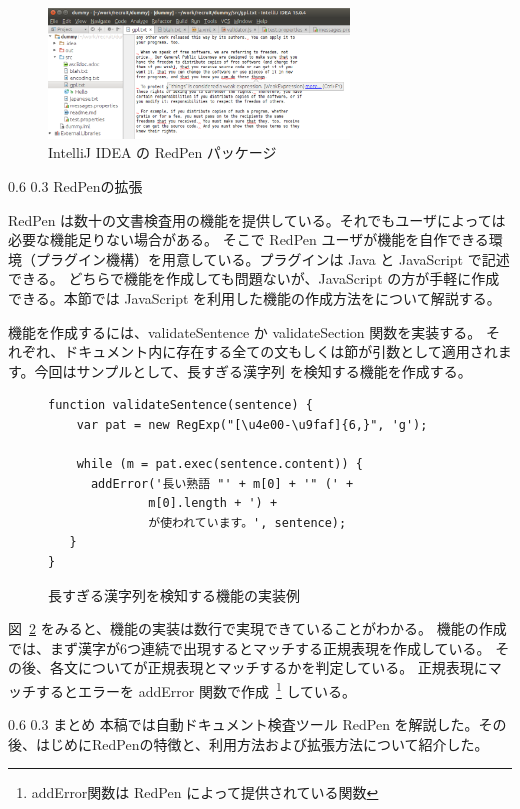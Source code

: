 \documentclass[a4j,twocolumn]{jarticle}
\makeatletter
\def\section{\@startsection{section}{1}{\z@}%
   {0.6\Cvs}%
   {0.3\Cvs}%
   {\reset@font\fontsize{10.5pt}{0pt}\bfseries}}
\makeatother
\begin{document}
\begin{figure}[thbp]
  \begin{center}
    \includegraphics[width=8cm]{figs/intellij.eps}
  \end{center}
  \caption{IntelliJ IDEA の RedPen パッケージ}
  \label{fig:intellij-idea}
\end{figure}  

\section{RedPenの拡張}
\label{sec:extension}

RedPen は数十の文書検査用の機能を提供している。それでもユーザによっては必要な機能足りない場合がある。
そこで RedPen ユーザが機能を自作できる環境（プラグイン機構）を用意している。プラグインは Java と JavaScript で記述できる。
どちらで機能を作成しても問題ないが、JavaScript の方が手軽に作成できる。本節では JavaScript を利用した機能の作成方法をについて解説する。

機能を作成するには、validateSentence か validateSection 関数を実装する。
それぞれ、ドキュメント内に存在する全ての文もしくは節が引数として適用されます。今回はサンプルとして、長すぎる漢字列
を検知する機能を作成する。

\begin{figure}
  \scriptsize
  \small
  \begin{verbatim}
function validateSentence(sentence) {
    var pat = new RegExp("[\u4e00-\u9faf]{6,}", 'g');

    while (m = pat.exec(sentence.content)) {
      addError('長い熟語 "' + m[0] + '" (' +
              m[0].length + ') +
              が使われています。', sentence);
   }
}
  \end{verbatim}
  \normalsize
  \caption{長すぎる漢字列を検知する機能の実装例}
  \label{fig:js-validator}
\end{figure}

図~\ref{fig:js-validator} をみると、機能の実装は数行で実現できていることがわかる。
機能の作成では、まず漢字が6つ連続で出現するとマッチする正規表現を作成している。
その後、各文についてが正規表現とマッチするかを判定している。
正規表現にマッチするとエラーを addError 関数で作成~\footnote{addError関数は RedPen によって提供されている関数} している。

\section{まとめ}
本稿では自動ドキュメント検査ツール RedPen を解説した。その後、はじめにRedPenの特徴と、利用方法および拡張方法について紹介した。



\end{document}

